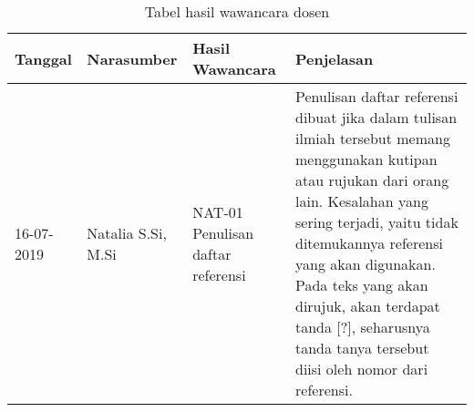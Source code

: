 \begin{table}[H]
	\caption {Tabel hasil wawancara dosen} \label{tab:hasil_wawancara}
	\begin{center}
		\begin{tabular}{|p{2 cm}|>{\raggedright} p{3.5 cm}| p{4 cm}| p{5 cm}|}
		\hline
		Tanggal & Narasumber & Hasil Wawancara & Penjelasan \\ 
		\hline
		16-07-2019 & Natalia S.Si, M.Si & NAT-01 \newline Penulisan daftar referensi & Penulisan daftar referensi dibuat jika dalam tulisan ilmiah tersebut memang menggunakan kutipan atau rujukan dari orang lain. Kesalahan yang sering terjadi, yaitu tidak ditemukannya referensi yang akan digunakan. Pada teks yang akan dirujuk, akan terdapat tanda [?], seharusnya tanda tanya tersebut diisi oleh nomor dari referensi. \newline \\ 
		\hline
		\end{tabular}
	\end{center}
\end{table}

